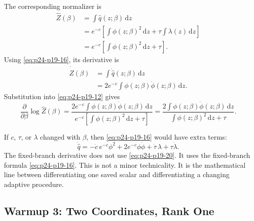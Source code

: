 \documentclass[11pt]{article}
\numberwithin{equation}{section}
\newcommand{\dd}{\,\mathrm d}
\begin{document}
The corresponding normalizer is
\begin{equation}
\begin{aligned}
    \widehat Z(\beta)
    &=
    \int \widehat q(z;\beta)\dd z\\
    &=
    e^{-c}\left[
    \int \phi(z;\beta)^2\dd z
    +
    \tau\int\lambda(z)\dd z
    \right]\\
    &=
    e^{-c}\left[\int \phi(z;\beta)^2\dd z+\tau\right].
\end{aligned}
\label{eq:p24-p19-17}
\end{equation}
Using \eqref{eq:p24-p19-16}, its derivative is
\begin{equation}
\begin{aligned}
    \dot{\widehat Z}(\beta)
    &=
    \int \dot{\widehat q}(z;\beta)\dd z\\
    &=
    2e^{-c}
    \int \phi(z;\beta)\dot\phi(z;\beta)\dd z.
\end{aligned}
\label{eq:p24-p19-18}
\end{equation}
Substitution into \eqref{eq:p24-p19-12} gives
\begin{equation}
    \frac{\partial}{\partial\beta}\log\widehat Z(\beta)
    =
    \frac{
    2e^{-c}\int \phi(z;\beta)\dot\phi(z;\beta)\dd z}
    {e^{-c}\left[\int\phi(z;\beta)^2\dd z+\tau\right]}
    =
    \frac{
    2\int \phi(z;\beta)\dot\phi(z;\beta)\dd z}
    {\int\phi(z;\beta)^2\dd z+\tau}.
    \label{eq:p24-p19-19}
\end{equation}

If \(c\), \(\tau\), or \(\lambda\) changed with \(\beta\), then \eqref{eq:p24-p19-16} would have
extra terms:
\begin{equation}
    \dot{\widehat q}
    =
    -\dot c\,e^{-c}\phi^2
    +
    2e^{-c}\phi\dot\phi
    +
    \dot\tau\,\lambda
    +
    \tau\dot\lambda.
    \label{eq:p24-p19-20}
\end{equation}
The fixed-branch derivative does not use \eqref{eq:p24-p19-20}.  It uses the fixed-branch
formula \eqref{eq:p24-p19-16}.  This is not a minor technicality.  It is the mathematical line
between differentiating one saved scalar and differentiating a changing
adaptive procedure.

\subsection{Warmup 3: Two Coordinates, Rank One}
\end{document}
